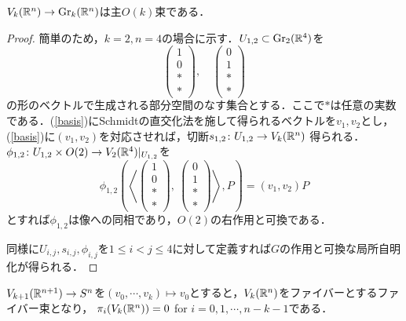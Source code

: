\begin{prop}
  $V_k(\mathbb{R}^n)\rightarrow \text{Gr}_k(\mathbb{R}^n)$は主$O(k)$束である．
\end{prop}

\begin{proof}
  簡単のため，$k=2,n=4$の場合に示す．$U_{1,2}\subset \text{Gr}_2(\mathbb{R}^4)$を
  \begin{equation}\label{basis}
    \left(\begin{array}{c}
      1\\0\\ * \\ *
    \end{array}\right),\quad \left(\begin{array}{c}
      0\\1\\ * \\ *
    \end{array}\right)
  \end{equation}
  の形のベクトルで生成される部分空間のなす集合とする．ここで$*$は任意の実数である．(\ref{basis})にSchmidtの直交化法を施して得られるベクトルを$v_1,v_2$とし，(\ref{basis})に$(v_1,v_2)$を対応させれば，切断$s_{1,2}\colon U_{1,2}\rightarrow V_k(\mathbb{R}^n)$
  得られる．$\phi_{1,2}\colon U_{1,2}\times O(2)\rightarrow V_{2}(\mathbb{R}^4)|_{U_{1,2}}$を
  \[
  \phi_{1,2}(\left\langle
    \left(\begin{array}{c}
      1\\0\\ * \\ *
    \end{array}\right),\:\left(\begin{array}{c}
      0\\1\\ * \\ *
    \end{array}\right)
  \right\rangle, P) = (v_1,v_2)P
  \]
  とすれば$\phi_{1,2}$は像への同相であり，$O(2)$の右作用と可換である．
  
  同様に$U_{i,j},s_{i,j},\phi_{i,j}$を$1\leq i<j\leq 4$に対して定義すれば$G$の作用と可換な局所自明化が得られる．
\end{proof}

\begin{prop}
  $V_{k+1}(\mathbb{R}^{n+1})\rightarrow S^{n}$を$(v_0,\cdots,v_{k})\mapsto v_{0}$とすると，$V_{k}(\mathbb{R}^{n})$をファイバーとするファイバー束となり，
  $\pi_i(V_k(\mathbb{R}^n))=0$ for $i=0,1,\cdots,n-k-1$である．
\end{prop}

